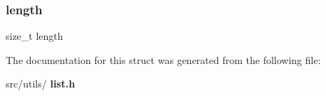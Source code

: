 \mbox{\label{structlist_ae809d5359ac030c60a30a8f0b2294b82}} 
\subsubsection{length}
{\footnotesize\ttfamily size\+\_\+t length}



The documentation for this struct was generated from the following file\+:\begin{DoxyCompactItemize}
\item 
src/utils/\textbf{ list.\+h}\end{DoxyCompactItemize}
